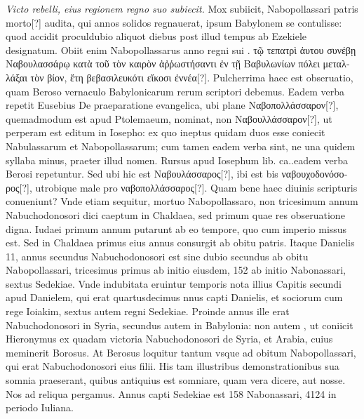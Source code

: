 \textit{Victo rebelli, eius regionem regno suo subiecit.}
Mox subiicit, Nabopollassari patris morto[?]
audita, qui  annos solidos regnauerat, ipsum Babylonem se
contulisse: quod accidit proculdubio aliquot diebus post illud tempus
ab Ezekiele designatum.
Obiit enim Nabopollassarus anno regni
sui .
\textgreek{τῷ τεπατρὶ ἀυτου συνέβῃ Ναβουλασσάρῳ κατὰ
 τοῦ τὸν καιρὸν
ἀῤῥωστήσαντι ἐν τῇ Βαβυλωνίων πόλει μεταλλάξαι τὸν βίον, ἔτη βεβασιλευκότι
εἴκοσι ἐννέα[?]}.
Pulcherrima haec est obseruatio, quam Beroso vernaculo
Babylonicarum rerum scriptori debemus.
Eadem verba repetit Eusebius
De praeparatione %
 evangelica, ubi plane \textgreek{Ναβοπολλάσσαρον[?]}, quemadmodum
est apud Ptolemaeum, %
 nominat, non \textgreek{Ναβουλλάσσαρον[?]}, ut perperam
est editum in Iosepho: ex quo ineptus quidam duos esse coniecit
Nabulassarum et Nabopollassarum; cum tamen eadem verba sint, ne
una quidem syllaba minus, praeter illud nomen.
Rursus apud Iosephum
lib. ca..eadem verba Berosi repetuntur.
Sed ubi hic est \textgreek{Ναβουλάσσαρος[?]},
ibi est bis \textgreek{ναβουχοδονόσορος[?]},
 utrobique male pro \textgreek{ναβοπολλάσσαρος[?]}.
Quam bene haec diuinis scripturis conueniunt?
Vnde etiam sequitur, mortuo Nabopollassaro, non tricesimum
 annum Nabuchodonosori
dici caeptum in Chaldaea, sed primum quae res obseruatione
digna.
%
Iudaei primum annum putarunt ab eo tempore, quo
cum imperio missus est. Sed in Chaldaea primus eius annus consurgit
ab obitu patris.
Itaque Danielis 11, annus secundus Nabuchodonosori
est sine dubio secundus ab obitu Nabopollassari, tricesimus
primus ab initio eiusdem, 152 ab initio Nabonassari, sextus
Sedekiae.
Vnde indubitata eruintur temporis nota illius Capitis secundi
apud Danielem, qui erat quartusdecimus nnus capti Danielis,
et sociorum cum rege Ioiakim, sextus autem regni Sedekiae.
Proinde annus ille erat  Nabuchodonosori
 in Syria, secundus
autem in Babylonia: non autem , ut coniicit Hieronymus
ex quadam victoria Nabuchodonosori de Syria, et Arabia, cuius
meminerit Borosus.
At Berosus loquitur tantum vsque ad obitum
Nabopollassari, qui erat  Nabuchodonosori eius filii.
His tam illustribus demonstrationibus sua somnia praeserant,
 quibus antiquius
est somniare, quam vera dicere, aut nosse.
Nos ad reliqua
pergamus.
Annus capti Sedekiae est 158 Nabonassari, 4124 in periodo Iuliana.
